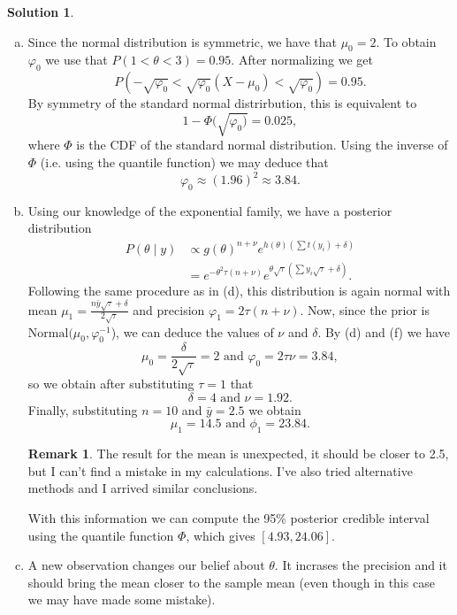 \documentclass{article}
\theoremstyle{plain}
\theoremstyle{definition}
\newtheorem*{sol*}{Solution}
\newtheorem{remark}{Remark}
\begin{document}
\begin{sol*}
\begin{enumerate}[(a)]
\item  Since the normal distribution is  symmetric, we have that $\mu_0=2$. To obtain $\varphi_0$ we use that $P(1<\theta< 3) = 0.95$. After normalizing we get
\[P(-\sqrt{\varphi_0}<\sqrt{\varphi_0}(X-\mu_0)<\sqrt{\varphi
_0})=0.95.\]
By symmetry of the standard normal distrirbution, this is equivalent to
\[1-\Phi(\sqrt{\varphi_0)}=0.025,\]
where $\Phi$ is the CDF of the standard normal distribution. Using the inverse of $\Phi$ (i.e. using the quantile function) we may deduce that
\[\varphi_0 \approx (1.96)^2\approx 3.84.\]
\item Using our knowledge of the exponential family, we have a posterior distribution
\begin{align*}
P(\theta\mid y) &\propto g(\theta)^{n+\nu}e^{h(\theta)(\sum t(y_i)+\delta)}\\
& = e^{-\theta^2\tau(n+\nu)}e^{\theta\sqrt{\tau}(\sum y_i\sqrt{\tau}+\delta)}.
\end{align*}
Following the same procedure as in (d), this distribution is again normal with mean $\mu_1=\frac{n\bar{y}\sqrt{\tau}+\delta}{2\sqrt{\tau}}$ and precision $\varphi_1 = 2\tau(n+\nu)$. Now, since the prior is $\mathrm{Normal}(\mu_0,\varphi_0^{-1}$), we can deduce the values of $\nu$ and $\delta$. By (d) and (f) we have
\[\mu_0 = \frac{\delta}{2\sqrt{\tau}}=2\text{ and }\varphi_0 = 2\tau\nu=3.84,\]
so we obtain after substituting $\tau=1$ that 
\[\delta = 4\text{ and }\nu = 1.92.\]
Finally, substituting $n=10$ and $\bar{y}=2.5$ we obtain
\[
\mu_1 = 14.5\text{ and }\phi_1 = 23.84.
\]
\begin{remark}
The result for the mean is unexpected, it should be closer to 2.5, but I can't find a mistake in my calculations. I've also tried alternative methods and I arrived similar conclusions.
\end{remark}

With this information we can compute the 95\% posterior credible interval using the quantile function $\Phi$, which gives $[4.93,24.06]$.

\item A new observation changes our belief about $\theta$. It incrases the precision and it should bring the mean closer to the sample mean (even though in this case we may have made some mistake).   
\end{enumerate}

\end{sol*}
\end{document}
